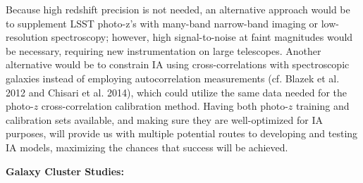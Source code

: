 Because high redshift precision is not needed, an alternative approach would be to supplement LSST photo-z's with many-band narrow-band imaging or low-resolution spectroscopy; however, high signal-to-noise at faint magnitudes would be necessary, requiring new instrumentation on large telescopes.
%
Another alternative would be to constrain IA using cross-correlations with spectroscopic galaxies instead of employing
autocorrelation measurements (cf. Blazek et al. 2012 and Chisari et al. 2014), which could utilize the same data needed for the photo-$z$ cross-correlation calibration method.
Having both photo-$z$ training and calibration sets available, and making sure they are well-optimized for IA purposes, will provide us with multiple potential routes to developing and testing IA models, maximizing the chances that success will be achieved.



{\bf Galaxy Cluster Studies:}





